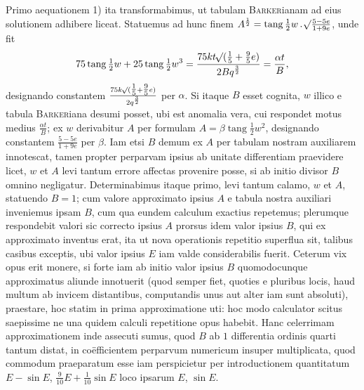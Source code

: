 Primo aequationem 1) ita transformabimus, ut tabulam \textsc{Barker}ianam ad eius solutionem adhibere liceat. Statuemus ad hunc finem $A^{\frac{1}{2}}=\operatorname{tang}\tfrac{1}{2}w\,\mathord{.}\,\mathord{{}^{}\!\surd}\frac{5-5e}{1+9e}$, unde fit
\[
75\operatorname{tang}\tfrac{1}{2}w+25\operatorname{tang}\tfrac{1}{2}w^3=\frac{75kt\mathord{{}^{}\!\surd}(\tfrac{1}{5}+\tfrac{9}{5}e)}{2Bq^{\frac{3}{2}}}=\frac{\alpha t}{B},
\]
designando constantem $\frac{75k\mathord{{}^{}\!\surd}(\tfrac{1}{5}+\tfrac{9}{5}e)}{2q^{\frac{3}{2}}}$ per $\alpha$\HistoricalNoteEight{Handschriftliche Bemerkung:] Wenn man \textsc{Burckhardts} Tafel [Connaissance des Temps 1818; s. auch Bd. VI. S. 596] braucht, $\frac{\BareRoot{(\tfrac{1}{10}+\tfrac{9}{10}e)}}{q^{\frac{3}{2}}}=\alpha$.}. Si itaque $B$ esset cognita, $w$ illico e tabula \textsc{Barker}iana desumi posset, ubi est anomalia vera, cui respondet motus medius $\frac{\alpha t}{B}$; ex $w$ derivabitur $A$ per formulam $A=\beta\operatorname{tang}\tfrac{1}{2}w^2$, designando constantem $\frac{5-5e}{1+9e}$ per $\beta$. Iam etsi $B$ demum ex $A$ per tabulam nostram auxiliarem innotescat, tamen propter perparvam ipsius ab unitate differentiam praevidere licet, $w$ et $A$ levi tantum errore affectas provenire posse, si ab initio divisor $B$ omnino negligatur. Determinabimus itaque primo, levi tantum calamo, $w$ et $A$, statuendo $B=1$; cum valore approximato ipsius $A$ e tabula nostra auxiliari inveniemus ipsam $B$, cum qua eundem calculum exactius repetemus; plerumque respondebit valori sic correcto ipsius $A$ prorsus idem valor ipsius $B$, qui ex approximato inventus erat, ita ut nova operationis repetitio superflua sit, talibus casibus exceptis, ubi valor ipsius $E$ iam valde considerabilis fuerit. Ceterum vix opus erit monere, si forte iam ab initio valor ipsius $B$ quomodocunque approximatus aliunde innotuerit (quod semper fiet, quoties e pluribus locis, haud multum ab invicem distantibus, computandis unus aut alter iam sunt absoluti), praestare, hoc statim in prima approximatione uti: hoc modo calculator scitus saepissime ne una quidem calculi repetitione opus habebit. Hanc celerrimam approximationem inde assecuti sumus, quod $B$ ab $1$ differentia ordinis quarti tantum distat, in coëfficientem perparvum numericum insuper multiplicata, quod commodum praeparatum esse iam perspicietur per introductionem quantitatum $E-\sin E$, $\tfrac{9}{10}E+\tfrac{1}{10}\sin E$ loco ipsarum $E$, $\sin E$.
